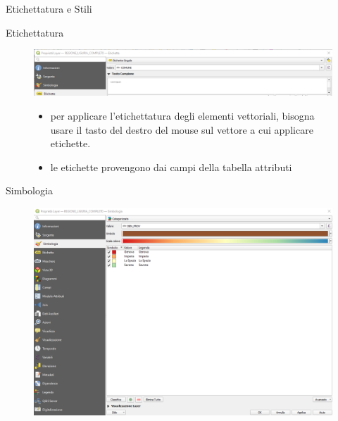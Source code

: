 \documentclass{beamer}
\begin{document}
{\begin{frame}{Etichettatura e Stili}
\begin{figure}
    
    
\end{figure}
    
\end{frame}

\begin{frame}{Etichettatura}
\begin{figure}
   
        \centering
        \includegraphics[width=1\linewidth]{etichette.png}
        \begin{itemize}
            \item per applicare l'etichettatura degli elementi vettoriali, bisogna usare il tasto del destro del mouse sul vettore a cui applicare etichette.
            \item le etichette provengono dai campi della tabella attributi        
        \end{itemize}
        
        
    \end{figure}
    
\end{frame}

\begin{frame}{Simbologia}
\begin{figure}
     \centering
     \includegraphics[width=0.75\linewidth]{corso2023/simbologia.png}
     
 \end{figure} 
    
\end{frame}

}
\end{document}
